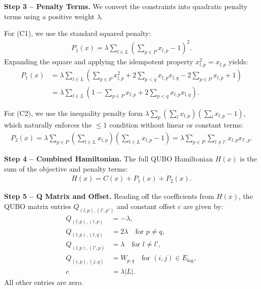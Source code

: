 \documentclass[12pt]{article}
\begin{document}
\textbf{Step 3 -- Penalty Terms.} We convert the constraints into quadratic penalty terms using a positive weight $\lambda$.

For (C1), we use the standard squared penalty:
\begin{align}
P_1(x) = \lambda \sum_{l \in L} \left( \sum_{p \in P} x_{l,p} - 1 \right)^2.
\end{align}
Expanding the square and applying the idempotent property $x_{l,p}^2 = x_{l,p}$ yields:
\begin{align}
P_1(x) &= \lambda \sum_{l \in L} \left( \sum_{p \in P} x_{l,p}^2 + 2 \sum_{p < q} x_{l,p} x_{l,q} - 2 \sum_{p \in P} x_{l,p} + 1 \right) \nonumber \\
&= \lambda \sum_{l \in L} \left( 1 - \sum_{p \in P} x_{l,p} + 2 \sum_{p < q} x_{l,p} x_{l,q} \right).
\end{align}

For (C2), we use the inequality penalty form $\lambda \sum_p (\sum_l x_{l,p})(\sum_l x_{l,p} - 1)$, which naturally enforces the $\le 1$ condition without linear or constant terms:
\begin{align}
P_2(x) = \lambda \sum_{p \in P} \left( \sum_{l \in L} x_{l,p} \right) \left( \sum_{l \in L} x_{l,p} - 1 \right) = \lambda \sum_{p \in P} \sum_{l \neq l'} x_{l,p} x_{l',p}.
\end{align}

\textbf{Step 4 -- Combined Hamiltonian.} The full QUBO Hamiltonian $H(x)$ is the sum of the objective and penalty terms:
\begin{align}
H(x) = C(x) + P_1(x) + P_2(x).
\end{align}

\textbf{Step 5 -- Q Matrix and Offset.} Reading off the coefficients from $H(x)$, the QUBO matrix entries $Q_{(l,p),(l',p')}$ and constant offset $c$ are given by:
\begin{align}
Q_{(l,p),(l,p)} &= -\lambda, \\
Q_{(l,p),(l,q)} &= 2\lambda \quad \text{for } p \neq q, \\
Q_{(l,p),(l',p)} &= \lambda \quad \text{for } l \neq l', \\
Q_{(i,p),(j,q)} &= W_{p,q} \quad \text{for } (i,j) \in E_{\text{log}}, \\
c &= \lambda |L|.
\end{align}
All other entries are zero.
\end{document}
